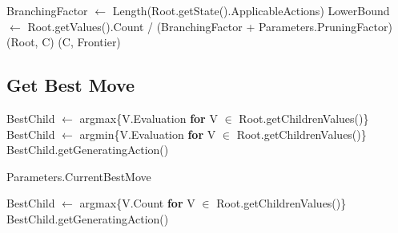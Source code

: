 \begin{algorithm}[H]
    \begin{algorithmic}[1]
            \State BranchingFactor $\gets$ Length(Root.getState().ApplicableActions)
            \State LowerBound $\gets$ Root.getValues().Count / (BranchingFactor + Parameters.PruningFactor) 
                    \State {}(Root, C)
                    \State {}(C, Frontier)
                \EndIf
            \EndFor
            
        \EndProcedure
    \end{algorithmic}    
\end{algorithm}


\newpage
\subsection*{Get Best Move}
\begin{algorithm}[H]
    \begin{algorithmic}[1]
                \State BestChild $\gets$ argmax\{V.Evaluation \textbf{for} V $\in$ Root.getChildrenValues()\}
            \Else
                \State BestChild $\gets$ argmin\{V.Evaluation \textbf{for} V $\in$ Root.getChildrenValues()\}
            \EndIf
            \State \Return BestChild.getGeneratingAction()
        \EndProcedure
    \end{algorithmic}    
\end{algorithm}

\begin{algorithm}[H]
    \begin{algorithmic}[1]
            \State \Return Parameters.CurrentBestMove 
        \EndProcedure
    \end{algorithmic}    
\end{algorithm}

\begin{algorithm}[H]
    \begin{algorithmic}[1]
            \State BestChild $\gets$ argmax\{V.Count \textbf{for} V $\in$ Root.getChildrenValues()\}
            \State \Return BestChild.getGeneratingAction() 
        \EndProcedure
    \end{algorithmic}    
\end{algorithm}

